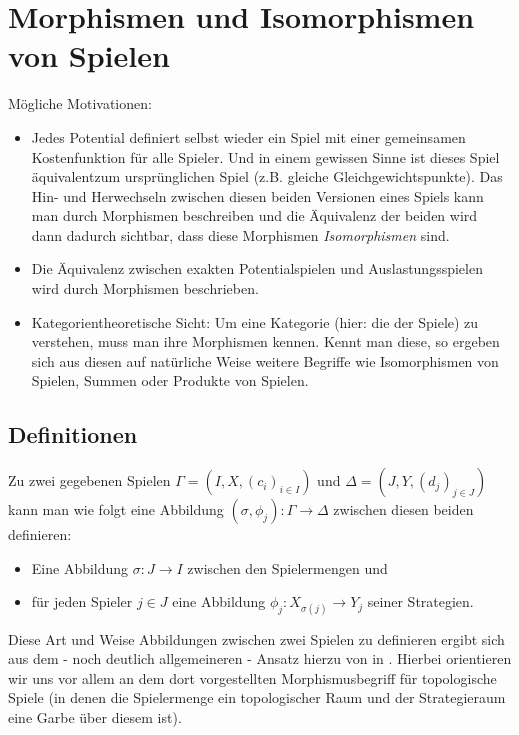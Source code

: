\section[Morphismen]{Morphismen und Isomorphismen von Spielen}\label{sec:Morphismen}


Mögliche Motivationen:
\begin{itemize}
	\item Jedes Potential definiert selbst wieder ein Spiel mit einer gemeinsamen Kostenfunktion für alle Spieler. Und in einem gewissen Sinne ist dieses Spiel \glqq äquivalent\grqq zum ursprünglichen Spiel (z.B. gleiche Gleichgewichtspunkte). Das Hin- und Herwechseln zwischen diesen beiden Versionen eines Spiels kann man durch Morphismen beschreiben und die Äquivalenz der beiden wird dann dadurch sichtbar, dass diese Morphismen \emph{Isomorphismen} sind.
	\item Die Äquivalenz zwischen exakten Potentialspielen und Auslastungsspielen wird durch Morphismen beschrieben.
	\item Kategorientheoretische Sicht: Um eine Kategorie (hier: die der Spiele) zu verstehen, muss man ihre Morphismen kennen. Kennt man diese, so ergeben sich aus diesen auf natürliche Weise weitere Begriffe wie Isomorphismen von Spielen, Summen oder Produkte von Spielen.
\end{itemize}


\subsection{Definitionen}

Zu zwei gegebenen Spielen $\Gamma = (I, X, (c_i)_{i\in I})$ und $\Delta = (J, Y, (d_j)_{j\in J})$ kann man wie folgt eine Abbildung $(\sigma, \phi_j): \Gamma \to \Delta$ zwischen diesen beiden definieren:
\begin{itemize}
	\item Eine Abbildung $\sigma: J \to I$ zwischen den Spielermengen und
	\item für jeden Spieler $j \in J$ eine Abbildung $\phi_j: X_{\sigma(j)} \to Y_j$ seiner Strategien.
\end{itemize}

Diese Art und Weise Abbildungen zwischen zwei Spielen zu definieren ergibt sich aus dem - noch deutlich allgemeineren - Ansatz hierzu von \citeauthor{LapGameCat} in \cite{LapGameCat}. Hierbei orientieren wir uns vor allem an dem dort vorgestellten Morphismusbegriff für topologische Spiele (in denen die Spielermenge ein topologischer Raum und der Strategieraum eine Garbe über diesem ist). 

